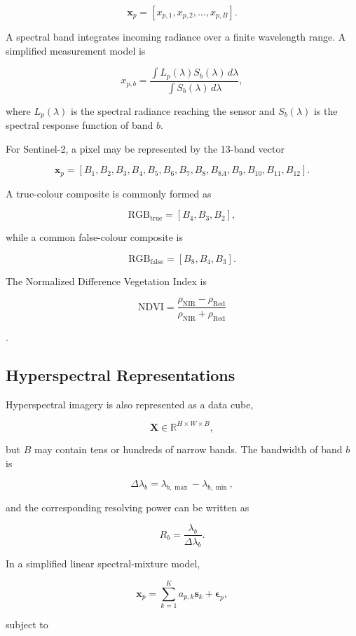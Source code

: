 \documentclass[
    11pt,
    a4paper,
    parskip=half,
    bibliography=totoc,
    numbers=noenddot
]{scrartcl}
\begin{document}
\[
\mathbf{x}_p =
\left[
x_{p,1},
x_{p,2},
\ldots,
x_{p,B}
\right].
\]

A spectral band integrates incoming radiance over a finite wavelength
range. A simplified measurement model is

\[
x_{p,b}
=
\frac{
    \int L_p(\lambda)S_b(\lambda)\,d\lambda
}{
    \int S_b(\lambda)\,d\lambda
},
\]

where \(L_p(\lambda)\) is the spectral radiance reaching the sensor and
\(S_b(\lambda)\) is the spectral response function of band \(b\).

For Sentinel-2, a pixel may be represented by the 13-band vector

\[
\mathbf{x}_p =
\left[
B_1,B_2,B_3,B_4,B_5,B_6,B_7,B_8,B_{8A},B_9,B_{10},B_{11},B_{12}
\right].
\]

A true-colour composite is commonly formed as

\[
\mathrm{RGB}_{\mathrm{true}}=[B_4,B_3,B_2],
\]

while a common false-colour composite is

\[
\mathrm{RGB}_{\mathrm{false}}=[B_8,B_4,B_3].
\]

The Normalized Difference Vegetation Index is

\[
\mathrm{NDVI}
=
\frac{\rho_{\mathrm{NIR}}-\rho_{\mathrm{Red}}}
     {\rho_{\mathrm{NIR}}+\rho_{\mathrm{Red}}}
\]

\cite{rouse1974monitoring}.

\subsection{Hyperspectral Representations}

Hyperspectral imagery is also represented as a data cube,

\[
\mathbf{X}\in\mathbb{R}^{H\times W\times B},
\]

but \(B\) may contain tens or hundreds of narrow bands. The bandwidth of
band \(b\) is

\[
\Delta\lambda_b =
\lambda_{b,\max}-\lambda_{b,\min},
\]

and the corresponding resolving power can be written as

\[
R_b=\frac{\lambda_b}{\Delta\lambda_b}.
\]

In a simplified linear spectral-mixture model,

\[
\mathbf{x}_p
=
\sum_{k=1}^{K}a_{p,k}\mathbf{s}_k
+
\boldsymbol{\epsilon}_p,
\]

subject to
\end{document}
